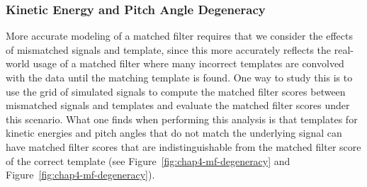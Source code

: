 \subsubsection*{Kinetic Energy and Pitch Angle Degeneracy}

More accurate modeling of a matched filter requires that we consider the effects of mismatched signals and template, since this more accurately reflects the real-world usage of a matched filter where many incorrect templates are convolved with the data until the matching template is found. One way to study this is to use the grid of simulated signals to compute the matched filter scores between mismatched signals and templates and evaluate the matched filter scores under this scenario. What one finds when performing this analysis is that templates for kinetic energies and pitch angles that do not match the underlying signal can have matched filter scores that are indistinguishable from the matched filter score of the correct template (see Figure~\ref{fig:chap4-mf-degeneracy} and Figure~\ref{fig:chap4-mf-degeneracy}).
